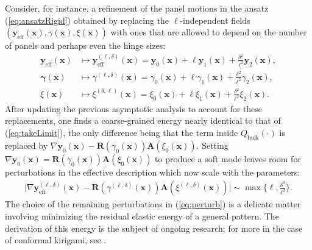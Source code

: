 \documentclass[aps,11pt,tightenlines,notitlepage,superscriptaddress,longbibliography,nofootinbib]{revtex4-1}
\begin{document}
Consider, for instance, a refinement of the panel motions in the ansatz (\ref{eq:ansatzRigid}) obtained by replacing the $\ell$-independent fields $(\mathbf{y}_{\text{eff}}(\mathbf{x}) , \gamma(\mathbf{x}), \xi(\mathbf{x}))$ with ones that are allowed to depend on the number of panels and perhaps even the hinge sizes:
\begin{equation}
    \begin{aligned}\label{eq:perturb}
    \mathbf{y}_{\text{eff}}(\mathbf{x}) &\mapsto \mathbf{y}_{\text{eff}}^{(\ell,\delta)}(\mathbf{x}) = \mathbf{y}_{0}(\mathbf{x}) + \ell \mathbf{y}_1(\mathbf{x}) + \frac{\delta^2}{\ell^2} \mathbf{y}_2(\mathbf{x}),  \\
    \mathbf{\gamma}(\mathbf{x}) &\mapsto \gamma^{(\ell,\delta)}(\mathbf{x}) = \gamma_0(\mathbf{x}) + \ell \gamma_1(\mathbf{x}) + \frac{\delta^2}{\ell^2} \gamma_2(\mathbf{x}), \\ 
    \xi(\mathbf{x}) &\mapsto \xi^{(\delta,\ell)}(\mathbf{x}) = \xi_0(\mathbf{x}) + \ell \xi_1(\mathbf{x}) + \frac{\delta^2}{\ell^2} \xi_2(\mathbf{x}).
    \end{aligned}
\end{equation}
After updating the previous asymptotic analysis to account for these replacements, one finds a coarse-grained energy nearly identical to that of (\ref{eq:takeLimit}), the only difference being that the term inside $Q_{\text{bulk}}(\cdot)$ is replaced by $\nabla \mathbf{y}_{0}(\mathbf{x}) - \mathbf{R}(\gamma_0(\mathbf{x})) \mathbf{A}(\xi_0(\mathbf{x})).$ Setting $\nabla \mathbf{y}_{0}(\mathbf{x}) = \mathbf{R}(\gamma_0(\mathbf{x})) \mathbf{A}(\xi_0(\mathbf{x}))$ to produce a soft mode leaves room for perturbations in the effective description which now scale with the parameters:
\begin{equation}
\begin{aligned}\label{eq:PDEApprox}
\Big | \nabla \mathbf{y}_{\text{eff}}^{(\ell,\delta)}(\mathbf{x}) - \mathbf{R}(\gamma^{(\ell,\delta)}(\mathbf{x})) \mathbf{A}(\xi^{(\ell,\delta)}(\mathbf{x}))\Big | \sim \max \Big\{ \ell, \frac{\delta^2}{\ell^2} \Big\}.
\end{aligned}
\end{equation}
The choice of the remaining perturbations in (\ref{eq:perturb}) is a delicate matter involving minimizing the residual elastic energy of a general  pattern. The  derivation of this energy is the subject of ongoing research; for more in the case of conformal kirigami, see \cite{czajkowski2022conformal}. 
\end{document}
